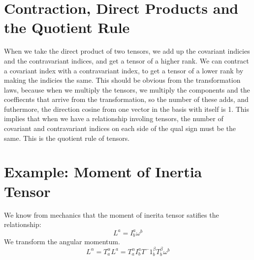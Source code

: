\documentclass[11pt,notitlepage]{article}
\begin{document}
\section{Contraction, Direct Products and the Quotient Rule}
When we take the direct product of two tensors, we add up the covariant indicies and the contravariant indices, and get a tensor of a higher rank. We can contract a covariant index with a contravariant index, to get a tensor of a lower rank by making the indicies the same. This should be obvious from the transformation laws, because when we multiply the tensors, we multiply the components and the coeffiecnts that arrive from the transformation, so the number of these adds, and futhermore, the direction cosine from one vector in the basis with itself is 1. 
This implies that when we have a relationship involing tensors, the number of covariant and contravariant indices on each side of the qual sign must be the same. This is the quotient rule of tensors.
\section{Example: Moment of Inertia Tensor}
We know from mechanics that the moment of inerita tensor satifies the relationship:
$$ L^a = I^a_b \omega^b $$
We transform the angular momentum. 
$$ L^\alpha = T^\alpha_a L^a = T^\alpha_a I^a_b T^-1^\beta_bT^\beta_b\omega^b$$
\end{document}
